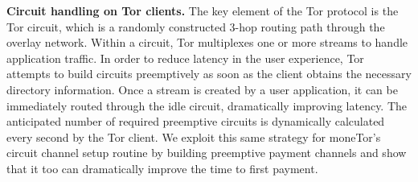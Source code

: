 \noindent
\textbf{Circuit handling on Tor clients.}
%
The key element of the Tor protocol is the Tor circuit, which is a randomly
constructed 3-hop routing path through the overlay network. Within a circuit,
Tor multiplexes one or more streams to handle application traffic. In order to
reduce latency in the user experience, Tor attempts to build circuits
preemptively as soon as the client obtains the necessary directory information.
Once a stream is created by a user application, it can be immediately routed
through the idle circuit, dramatically improving latency. The anticipated number
of required preemptive circuits is dynamically calculated every second by the
Tor client. We exploit this same strategy for moneTor's circuit channel setup
routine by building preemptive payment channels and show that it too can
dramatically improve the time to first payment.




